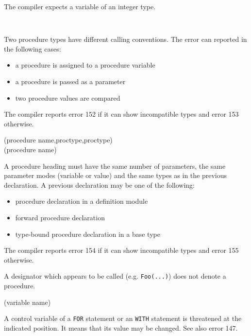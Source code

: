 
The compiler expects a variable of an integer type.

\ifonline\else\\\fi
{}

Two procedure types have different calling conventions. The error can reported
in the following cases:
\begin{itemize}
\item a procedure is assigned to a procedure variable
\item a procedure is passed as a parameter
\item two procedure values are compared
\end{itemize}
The compiler reports error 152 if it can show incompatible types and error 153
otherwise.

(procedure name,proctype,proctype)\ifonline\else\\\fi
{}
(procedure name)

A procedure heading must have the same number of parameters, the same
parameter modes (variable or value) and the same types as in the
previous declaration. A previous declaration may be one of the following:
\begin{itemize}
\item procedure declaration in a definition module
\item forward procedure declaration
\item type-bound procedure declaration in a base type
\end{itemize}

The compiler reports error 154 if it can show incompatible types and error 155
otherwise.


A designator which appears to be called (e.g. \verb'Foo(...)') does not
denote a procedure.


(variable name)

A control variable of a \verb'FOR' statement or an \ot \verb'WITH'
statement is threatened at the indicated position. It means that its
value may be changed. See also error 147.

